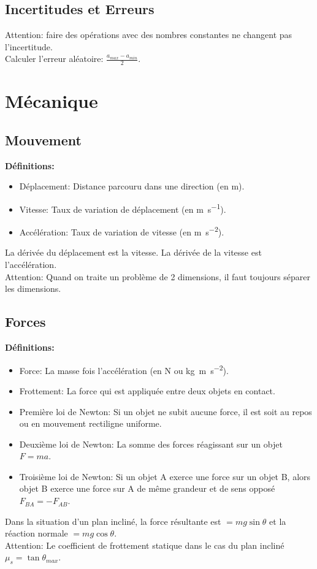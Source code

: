 \documentclass[french, a4paper, 12pt]{article}
\begin{document}
\subsection{Incertitudes et Erreurs}
Attention: faire des opérations avec des nombres constantes ne changent pas l'incertitude.\\
Calculer l'erreur aléatoire: $\frac{a_{max}-a_{min}}{2}$.
\pagebreak

\section{Mécanique}
\subsection{Mouvement}
\textbf{Définitions:}
\begin{itemize}
\item Déplacement: Distance parcouru dans une direction (en \si{\metre}).
\item Vitesse: Taux de variation de déplacement (en \si{\metre\per\second}).
\item Accélération: Taux de variation de vitesse (en \si{\metre\per\second\squared}).
\end{itemize}
La dérivée du déplacement est la vitesse. La dérivée de la vitesse est l'accélération.\\
Attention: Quand on traite un problème de 2 dimensions, il faut toujours séparer les dimensions.

\subsection{Forces}
\textbf{Définitions:}
\begin{itemize}
\item Force: La masse fois l'accélération (en \si{\newton} ou \si{\kilogram\metre\per\second\squared}).
\item Frottement: La force qui est appliquée entre deux objets en contact.
\item Première loi de Newton: Si un objet ne subit aucune force, il est soit au repos ou en mouvement rectiligne uniforme.
\item Deuxième loi de Newton: La somme des forces réagissant sur un objet $F=ma$.
\item Troisième loi de Newton: Si un objet A exerce une force sur un objet B, alors objet B exerce une force sur A de même grandeur et de sens opposé $F_{BA}=-F_{AB}$.
\end{itemize}
Dans la situation d'un plan incliné, la force résultante est $=mg\sin \theta$ et la réaction normale $=mg\cos \theta$.\\
Attention: Le coefficient de frottement statique dans le cas du plan incliné $\mu _s =\tan\theta_{max}$.
\end{document}
